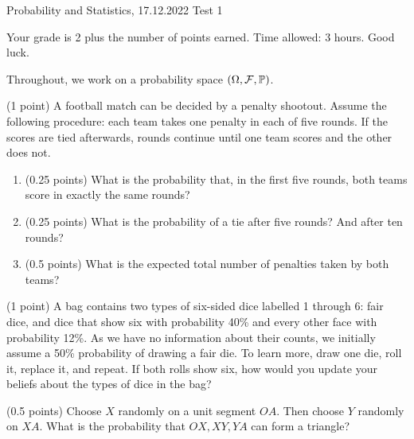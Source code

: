 \documentclass[a4paper]{report}
\begin{document}
\noindent Probability and Statistics, 17.12.2022 \hfill Test 1

\hrulefill

\begin{it}
Your grade is 2 plus the number of points earned. Time allowed: 3 hours. Good luck.

Throughout, we work on a probability space $(\Omega, {\mathcal{F}}, \mathbb P)$.

\end{it}

\begin{problem} (1 point)
A football match can be decided by a penalty shootout. Assume the following procedure:
each team takes one penalty in each of five rounds. If the scores are tied
afterwards, rounds continue until one team scores and the other does not.

\begin{enumerate}
    \item (0.25 points) What is the probability that, in the first five rounds,
    both teams score in exactly the same rounds?
    \item (0.25 points) What is the probability of a tie after five rounds?
    And after ten rounds?
    \item (0.5 points) What is the expected total number of penalties
    taken by both teams?
\end{enumerate}
\end{problem}

\begin{problem} (1 point)
A bag contains two types of six-sided dice labelled 1 through 6: fair dice, and dice that show six with probability 40\% and every other face with probability 12\%. As we have no information
about their counts, we initially assume a 50\% probability of drawing a fair die. To learn more, draw one die, roll it, replace it,
and repeat. If both rolls show six, how would you update your beliefs about the types of dice in the bag?
\end{problem}

\begin{problem} (0.5 points)
Choose $X$ randomly on a unit segment $OA$. Then choose $Y$ randomly on $XA$. What is the probability that
$OX,XY,YA$ can form a triangle?
\end{problem}
\end{document}
